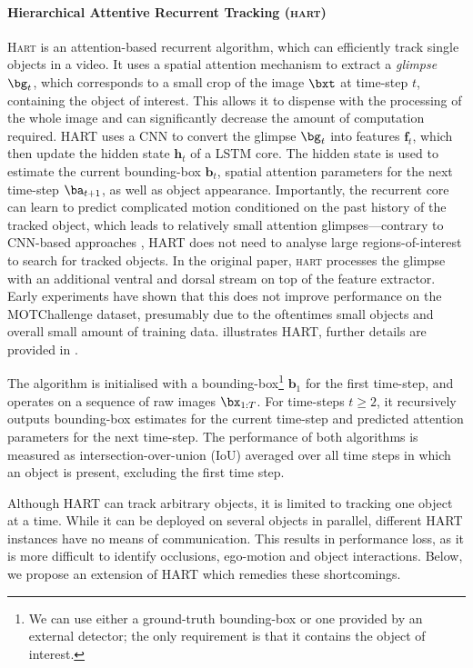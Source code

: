 \paragraph{Hierarchical Attentive Recurrent Tracking (\textsc{hart})}
\textsc{Hart} is an attention-based recurrent algorithm, which can efficiently track single objects in a video.
It uses a spatial attention mechanism to extract a \textit{glimpse} $\bg_t$, which corresponds to a small crop of the image $\bxt$ at time-step $t$, containing the object of interest.
This allows it to dispense with the processing of the whole image and can significantly decrease the amount of computation required.
\Gls{HART} uses a \gls{CNN} to convert the glimpse $\bg_t$ into features $\mathbf{f}_t$, which then update the hidden state $\mathbf{h}_t$ of a \gls{LSTM} core.
The hidden state is used to estimate the current bounding-box $\mathbf{b}_t$, spatial attention parameters for the next time-step $\ba_{t+1}$, as well as object appearance.
Importantly, the recurrent core can learn to predict complicated motion conditioned on the past history of the tracked object, which leads to relatively small attention glimpses---contrary to \gls{CNN}-based approaches \citep{Held2016goturn,Valmadre2017corr}, \gls{HART} does not need to analyse large regions-of-interest to search for tracked objects.
In the original paper, \textsc{hart} processes the glimpse with an additional ventral and dorsal stream on top of the feature extractor. Early experiments have shown that this does not improve performance on the MOTChallenge dataset, presumably due to the oftentimes small objects and overall small amount of training data. 
 illustrates \gls{HART}, further details are provided in .

	The algorithm is initialised with a bounding-box\footnote{We can use either a ground-truth bounding-box or one provided by an external detector; the only requirement is that it contains the object of interest.} $\mathbf{b}_1$ for the first time-step, and operates on a sequence of raw images $\bx_{1:T}$.
	For time-steps $t\geq2$, it recursively outputs bounding-box estimates for the current time-step and predicted attention parameters for the next time-step. The performance of both algorithms is measured as intersection-over-union (IoU) averaged over all time steps in which an object is present, excluding the first time step.

Although \gls{HART} can track arbitrary objects, it is limited to tracking one object at a time.
While it can  be deployed on several objects in parallel, different \gls{HART} instances have no means of communication.
This results in performance loss, as it is more difficult to identify 
occlusions, ego-motion and object interactions.
Below, we propose an extension of \gls{HART} which remedies these shortcomings.

